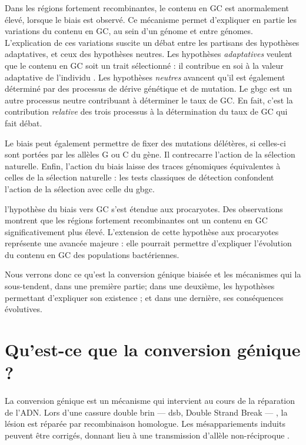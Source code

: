 \documentclass[11pt, oneside]{scrartcl}
\begin{document}
Dans les régions fortement recombinantes, le contenu en GC est anormalement
élevé, lorsque le biais est observé\cite{duret_impact_2008}. Ce mécanisme permet
d'expliquer en partie les variations du contenu en GC, au sein d'un génome et
entre génomes. L'explication de ces variations suscite un débat entre les
partisans des hypothèses adaptatives, et ceux des hypothèses neutres. Les
hypothèses \emph{adaptatives} veulent que le contenu en GC soit un trait
sélectionné : il contribue en soi à la valeur adaptative de l'individu
\cite{hildebrand_evidence_2010}. Les hypothèses \emph{neutres} avancent qu'il est
également déterminé par des processus de dérive génétique et de mutation. Le
\ac{gbgc} est un autre processus neutre contribuant à déterminer le taux de GC.
En fait, c'est la contribution \emph{relative} des trois processus à la détermination
du taux de GC qui fait débat.

Le biais peut également permettre de fixer des mutations délétères, si celles-ci
sont portées par les allèles G ou C du gène. Il contrecarre l'action de la
sélection naturelle\cite{galtier_gc-biased_2009, galtier_adaptation_2007}.
Enfin, l'action du biais laisse des traces génomiques équivalentes à celles de
la sélection naturelle : les tests classiques de détection confondent l'action
de la sélection avec celle du \ac{gbgc}\cite{ratnakumar_detecting_2010}.

 l'hypothèse du biais vers GC s'est étendue aux
procaryotes\cite{lassalle_gc-content_2015}. Des observations montrent que les
régions fortement recombinantes ont un contenu en GC significativement plus
élevé. L'extension de cette hypothèse aux procaryotes représente une avancée
majeure : elle pourrait permettre d'expliquer l'évolution du contenu en GC des
populations bactériennes.

Nous verrons donc ce qu'est la conversion génique biaisée et les mécanismes qui
la sous-tendent, dans une première partie; dans une deuxième, les hypothèses
permettant d'expliquer son existence ; et dans une dernière, ses conséquences
évolutives.

\section{Qu'est-ce que la conversion génique ?}
\label{sec:orgheadline8}

La conversion génique est un mécanisme qui intervient au cours de la réparation
de l'ADN. Lors d'une cassure double brin --- \ac{dsb}, Double Strand Break --- ,
la lésion est réparée par recombinaison homologue. Les mésappariements induits
peuvent être corrigés, donnant lieu à une transmission d'allèle non-réciproque
\cite{chen_mechanism_2008}.
\end{document}
